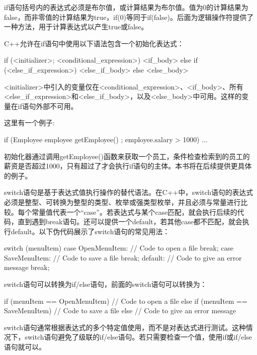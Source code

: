 if语句括号内的表达式必须是布尔值，或计算结果为布尔值。值为0的计算结果为false，而非零值的计算结果为true，if(0)等同于if(false)。后面为逻辑操作符提供了一种方法，用于计算表达式以产生true或false。


C++允许在if语句中使用以下语法包含一个初始化表达式：

\begin{cpp}
if (<initializer>; <conditional_expression>) {
    <if_body>
} else if (<else_if_expression>) {
    <else_if_body>
} else {
    <else_body>
}
\end{cpp}

<initializer>中引入的变量仅在<conditional\_expression>、<if\_body>、所有<else\_if\_expression>和<else\_if\_body>，以及<else\_body>中可用。这样的变量在if语句外部不可用。

这里有一个例子:

\begin{cpp}
if (Employee employee { getEmployee() }; employee.salary > 1000) { ... }
\end{cpp}

初始化器通过调用getEmployee()函数来获取一个员工，条件检查检索到的员工的薪资是否超过1000，只有超过了才会执行if语句的主体。本书将在后续提供更具体的例子。


switch语句是基于表达式值执行操作的替代语法。在C++中，switch语句的表达式必须是整型、可转换为整型的类型、枚举或强类型枚举，并且必须与常量进行比较。每个常量值代表一个“case”。若表达式与某个case匹配，就会执行后续的代码，直到遇到break语句。还可以提供一个default，若其他case都不匹配，就会执行default。以下伪代码展示了switch语句的常见用法：

\begin{cpp}
switch (menuItem) {
    case OpenMenuItem:
        // Code to open a file
        break;
    case SaveMenuItem:
        // Code to save a file
        break;
    default:
        // Code to give an error message
        break;
}
\end{cpp}

switch语句可以转换为if/else语句，前面的switch语句可以转换为：

\begin{cpp}
if (menuItem == OpenMenuItem) {
    // Code to open a file
} else if (menuItem == SaveMenuItem) {
    // Code to save a file
} else {
    // Code to give an error message
}
\end{cpp}

switch语句通常根据表达式的多个特定值使用，而不是对表达式进行测试。这种情况下，switch语句避免了级联的if/else语句。若只需要检查一个值，使用if或if/else语句就可以。

